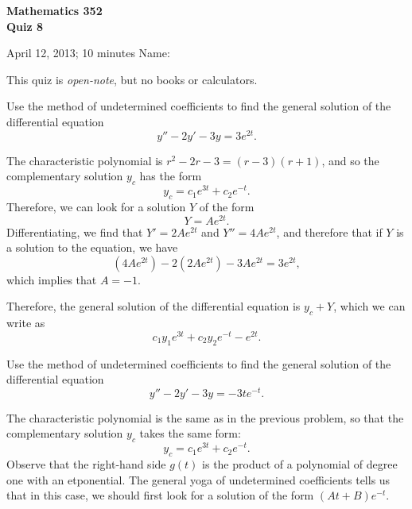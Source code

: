 \documentclass[answers,12pt]{exam}
\begin{document}
\noindent
\textbf{{\large Mathematics 352 \\ Quiz 8}}

\noindent
April 12, 2013; 10 minutes  \hfill Name: \underline{\hspace{3in}} 

\noindent
This quiz is \emph{open-note}, but no books or calculators.

\begin{questions}  

\question Use the method of undetermined coefficients to find the general solution of the differential equation
\[
    y'' - 2y' - 3y = 3e^{2t}.
\]

\begin{solution}
    The characteristic polynomial is $r^2 - 2r - 3 = (r-3)(r+1)$, and so the complementary solution $y_c$ has the form
    \[
        y_c = c_1 e^{3t} + c_2 e^{-t}.
    \]
    Therefore, we can look for a solution $Y$ of the form 
    \[
        Y = Ae^{2t}.
    \]
    Differentiating, we find that $Y' = 2Ae^{2t}$ and $Y'' = 4Ae^{2t}$, and therefore that if $Y$ is a solution to the equation, we have
    \[
        (4Ae^{2t}) - 2(2Ae^{2t}) - 3Ae^{2t} = 3e^{2t},
    \]
    which implies that $A = -1$.

    Therefore, the general solution of the differential equation is $y_c + Y$, which we can write as
    \[
        c_1 y_1 e^{3t} + c_2 y_2 e^{-t} - e^{2t}.
    \]
\end{solution}

\question Use the method of undetermined coefficients to find the general solution of the differential equation
\[
    y'' - 2y' - 3y = -3te^{-t}.
\]

\begin{solution}
    The characteristic polynomial is the same as in the previous problem, so that the complementary solution $y_c$ takes the same form:
    \[
        y_c = c_1 e^{3t} + c_2 e^{-t}.
    \]
    Observe that the right-hand side $g(t)$ is the product of a polynomial of degree one with an etponential. The general yoga of undetermined coefficients tells us that in this case, we should first look for a solution of the form $(At+B)e^{-t}$. 


\end{solution}
\end{questions}
\end{document}
